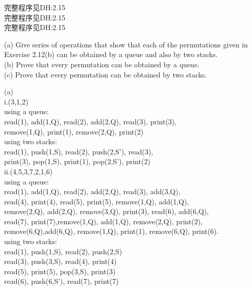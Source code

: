 \documentclass[11pt, a4paper, UTF8]{ctexart}
\begin{document}
\begin{solution}
完整程序见DH:2.15\\
完整程序见DH:2.15\\
完整程序见DH:2.15\\
\end{solution}


\begin{problem}[DH: 2.14]
(a) Give series of operations that show that each of the permutations given in Exercise 2.12(b) can be obtained by a queue and also by two stacks.\\
(b) Prove that every permutation can be obtained by a queue.\\
(c) Prove that every permutation can be obtained by two stacks.
\end{problem}


\begin{solution}
(a)\\
\indent \noindent i.(3,1,2)\\
\indent \noindent using a queue:\\
read(1), add(1,Q), read(2), add(2,Q), read(3), print(3), \\
remove(1,Q), print(1), remove(2,Q), print(2)\\
\indent \noindent using two stacks:\\
read(1), push(1,S), read(2), push(2,S'), read(3),\\
print(3), pop(1,S), print(1), pop(2,S'), print(2)\\
\indent \noindent ii.(4,5,3,7,2,1,6)\\
\indent \noindent using a queue:\\
read(1), add(1,Q), read(2), add(2,Q), read(3), add(3,Q),\\
read(4), print(4), read(5), print(5), remove(1,Q), add(1,Q),\\
remove(2,Q), add(2,Q), remove(3,Q), print(3), read(6), add(6,Q),\\
read(7), print(7),remove(1,Q), add(1,Q), remove(2,Q), print(2),\\
remove(6,Q),add(6,Q), remove(1,Q), print(1), remove(6,Q), print(6).\\
\indent \noindent using two stacks:\\
read(1), push(1,S), read(2), push(2,S)\\
read(3), push(3,S), read(4), print(4)\\
read(5), print(5), pop(3,S), print(3)\\
read(6), push(6,S'), read(7), print(7)\\

\end{solution}
\end{document}
